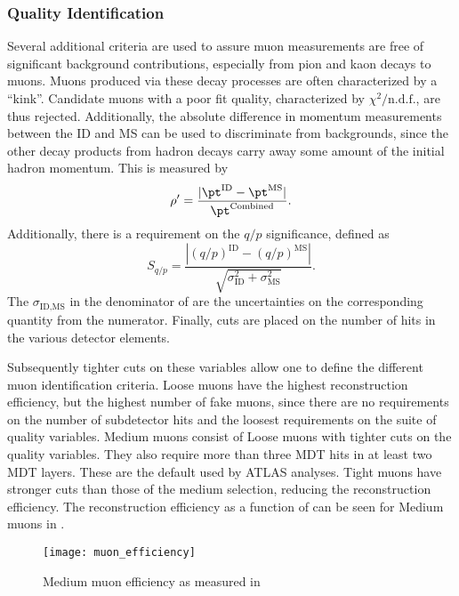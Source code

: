 \subsubsection{Quality Identification}

Several additional criteria are used to assure muon measurements are free of significant background contributions, especially from pion and kaon decays to muons.
Muons produced via these decay processes are often characterized by a ``kink''.
Candidate muons with a poor fit quality, characterized by $\chi^2/\text{n.d.f.}$, are thus rejected.
Additionally, the absolute difference in momentum measurements between the ID and MS can be used to discriminate from backgrounds, since the other decay products from hadron decays carry away some amount of the initial hadron momentum.
This is measured by
\begin{equation}
\rho' = \frac{|\pt^{\text{ID}} - \pt^{\text{MS}} |}{\pt^{\text{Combined}}}.
\end{equation}
Additionally, there is a requirement on the $q/p$ significance, defined as
\begin{equation}\label{eq:muon_sig}
S_{q/p} = \frac{|(q/p)^{\text{ID}} - (q/p)^{\text{MS}} |}{\sqrt{\sigma_{\text{ID}}^2 + \sigma_{\text{MS}}^2  }}.
\end{equation}
The $\sigma_{\text{ID,MS}}$ in the denominator of  are the uncertainties on the corresponding quantity from the numerator.
Finally, cuts are placed on the number of hits in the various detector elements.

Subsequently tighter cuts on these variables allow one to define the different muon identification criteria.
Loose muons have the highest reconstruction efficiency, but the highest number of fake muons, since there are no requirements on the number of subdetector hits and the loosest requirements on the suite of quality variables.
Medium muons consist of Loose muons with tighter cuts on the quality variables.
They also require more than three MDT hits in at least two MDT layers.
These are the default used by ATLAS analyses.
Tight muons have stronger cuts than those of the medium selection, reducing the reconstruction efficiency.
The reconstruction efficiency as a function of \pt can be seen for Medium muons in .

\begin{figure}
\caption{Medium muon efficiency as measured in~\cite{PERF-2015-10}} \label{fig:muon_eff}
\texttt{[image: muon\_efficiency]}
\end{figure}

